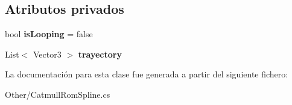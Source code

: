 \subsection*{Atributos privados}
\begin{DoxyCompactItemize}
\item 
\mbox{\label{class_catmull_rom_spline_a5ba0543d62e110611688190af0e1af76}} 
bool {\bfseries is\+Looping} = false
\item 
\mbox{\label{class_catmull_rom_spline_abf1cd3b958eecde443028bc4e0aa58df}} 
List$<$ Vector3 $>$ {\bfseries trayectory}
\end{DoxyCompactItemize}


La documentación para esta clase fue generada a partir del siguiente fichero\+:\begin{DoxyCompactItemize}
\item 
Other/Catmull\+Rom\+Spline.\+cs\end{DoxyCompactItemize}
